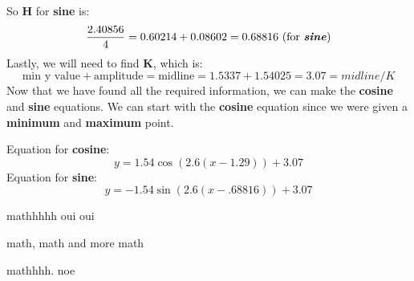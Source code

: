 \documentclass{article}
\begin{document}
\hfill \break
So \textbf{H} for \textbf{sine} is:
\hfill \break
\begin{displaymath}
    \frac{2.40856}{4}=0.60214+0.08602=0.68816\text{ (for \textit{\textbf{sine}})}
\end{displaymath}
Lastly, we will need to find \textbf{K}, which is:
\begin{displaymath}
    \text{min y value}+\text{amplitude}=\text{midline}=1.5337+1.54025=3.07=\textit{midline/K}
\end{displaymath}
\hfill \break
Now that we have found all the required information, we can make the \textbf{cosine} and \textbf{sine} equations. We can start with the \textbf{cosine} equation since we were given a \textbf{minimum} and \textbf{maximum} point.

\hfill \break
Equation for \textbf{cosine}:
\begin{displaymath}
    y=1.54\cos(2.6(x-1.29))+3.07
\end{displaymath}
\hfill \break
Equation for \textbf{sine}:
\begin{displaymath}
    y=-1.54\sin(2.6(x-.68816))+3.07
\end{displaymath}

\begin{tcolorbox}[
  colback=Magenta!5!white,
  colframe=Magenta!75!black,
  title={\centering Homework}]
mathhhhh oui oui
\end{tcolorbox}

\begin{tcolorbox}[
  colback=Magenta!5!white,
  colframe=Magenta!75!black,
  title={\centering Homework}]
math, math and more math
\end{tcolorbox}

\begin{tcolorbox}[
  colback=Magenta!5!white,
  colframe=Magenta!75!black,
  title={\centering Homework}]
mathhhh. noe
\end{tcolorbox}
\end{document}
